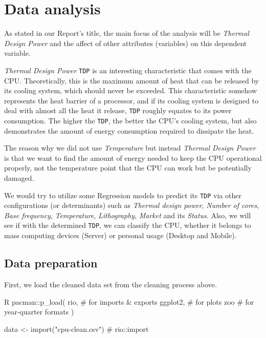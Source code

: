 %
%   
\section{Data analysis}
\label{section:data_analysis}

As stated in our Report's title, the main focus of the analysis will be \textit{Thermal Design Power} and the affect of
other attributes (variables) on this dependent variable.

\textit{Thermal Design Power} \verb|TDP| is an interesting characteristic that comes with the CPU. Theoretically, this is the
maximum amount of heat that can be released by its cooling system, which should never be exceeded. This characteristic somehow
represents the heat barrier of a processor, and if its cooling system is designed to deal with almost all the heat it release,
\verb|TDP| roughly equates to its power consumption. The higher the \verb|TDP|, the better the CPU's cooling system, but also 
demonstrates the amount of energy consumption required to dissipate the heat.

The reason why we did not use \textit{Temperature} but instead \textit{Thermal Design Power} is that we want to find the amount of
energy needed to keep the CPU operational properly, not the temperature point that the CPU can work but be potentially damaged.

We would try to utilize some Regression models to predict its \verb|TDP| via other configurations (or determinants) such as
\textit{Thermal design power}, \textit{Number of cores}, \textit{Base frequency}, \textit{Temperature}, \textit{Lithography},
\textit{Market} and its \textit{Status}. Also, we will see if with the determined \verb|TDP|, we can classify the CPU, whether
it belongs to mass computing devices (Server) or personal usage (Desktop and Mobile).









\subsection{Data preparation}

First, we load the cleaned data set from the cleaning process above.

\begin{code}{R}
pacman::p_load(
    rio,     # for imports & exports
    ggplot2, # for plots
    zoo      # for year-quarter formats
)

data <- import("cpu-clean.csv") # rio::import
\end{code}

